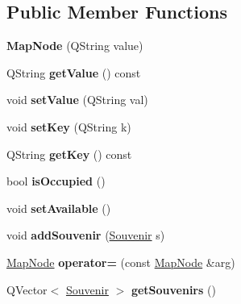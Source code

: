 \subsection*{Public Member Functions}
\begin{DoxyCompactItemize}
\item 
\mbox{\label{class_map_node_ab17429369aa016758d8019cb6d711f89}} 
{\bfseries Map\+Node} (Q\+String value)
\item 
\mbox{\label{class_map_node_a37c08b0ef2914ee3192cf8b4ced0a73c}} 
Q\+String {\bfseries get\+Value} () const
\item 
\mbox{\label{class_map_node_a8e0e044b760aa71c6e8ab4b437d00bc2}} 
void {\bfseries set\+Value} (Q\+String val)
\item 
\mbox{\label{class_map_node_af3732a07deb8c0c2479dc692c7dc5925}} 
void {\bfseries set\+Key} (Q\+String k)
\item 
\mbox{\label{class_map_node_a89e08f984169029557f0a1d55c9589a0}} 
Q\+String {\bfseries get\+Key} () const
\item 
\mbox{\label{class_map_node_a38667f219cc961d05f1b1dbe992f6419}} 
bool {\bfseries is\+Occupied} ()
\item 
\mbox{\label{class_map_node_a0b540119ef1bb56b08a7e78b18423d81}} 
void {\bfseries set\+Available} ()
\item 
\mbox{\label{class_map_node_a18d7e869ab2b41b195468a51f773ed74}} 
void {\bfseries add\+Souvenir} (\hyperlink{class_souvenir}{Souvenir} s)
\item 
\mbox{\label{class_map_node_a93399ff797254eb384d3980d9703fd14}} 
\hyperlink{class_map_node}{Map\+Node} {\bfseries operator=} (const \hyperlink{class_map_node}{Map\+Node} \&arg)
\item 
\mbox{\label{class_map_node_a5b944284ebea6e3d2fe12f6703ad20d6}} 
Q\+Vector$<$ \hyperlink{class_souvenir}{Souvenir} $>$ {\bfseries get\+Souvenirs} ()
\end{DoxyCompactItemize}
